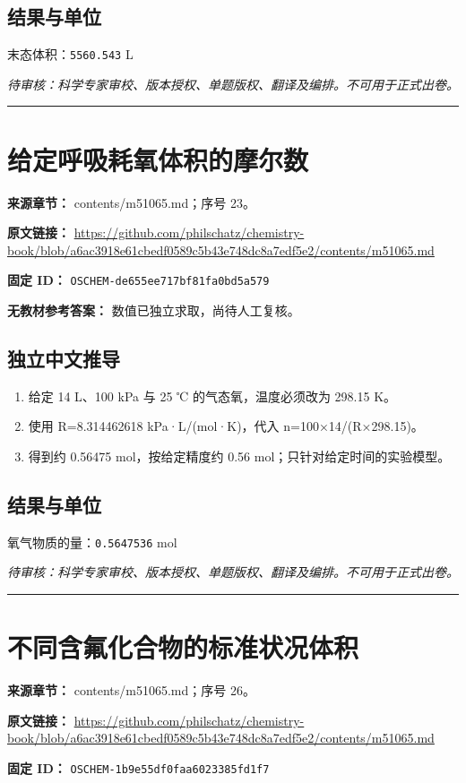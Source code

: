 \documentclass[UTF8,11pt,oneside,openany,fontset=none]{ctexbook}
\begin{document}
\subsection*{结果与单位}
\noindent 末态体积：\texttt{5560.543} L\par
\noindent\textit{待审核：科学专家审校、版本授权、单题版权、翻译及编排。不可用于正式出卷。}
\medskip\hrule\medskip
\section{给定呼吸耗氧体积的摩尔数}
\noindent\textbf{来源章节：} contents/m51065.md；序号 23。\par
\noindent\textbf{原文链接：} \url{https://github.com/philschatz/chemistry-book/blob/a6ac3918e61cbedf0589c5b43e748dc8a7edf5e2/contents/m51065.md}\par
\noindent\textbf{固定 ID：} \texttt{OSCHEM-de655ee717bf81fa0bd5a579}\par
\textbf{无教材参考答案：} 数值已独立求取，尚待人工复核。\par
\subsection*{独立中文推导}
\begin{enumerate}
\item 给定 14 L、100 kPa 与 25 ℃ 的气态氧，温度必须改为 298.15 K。
\item 使用 R=8.314462618 kPa·L/(mol·K)，代入 n=100×14/(R×298.15)。
\item 得到约 0.56475 mol，按给定精度约 0.56 mol；只针对给定时间的实验模型。
\end{enumerate}
\subsection*{结果与单位}
\noindent 氧气物质的量：\texttt{0.5647536} mol\par
\noindent\textit{待审核：科学专家审校、版本授权、单题版权、翻译及编排。不可用于正式出卷。}
\medskip\hrule\medskip
\section{不同含氟化合物的标准状况体积}
\noindent\textbf{来源章节：} contents/m51065.md；序号 26。\par
\noindent\textbf{原文链接：} \url{https://github.com/philschatz/chemistry-book/blob/a6ac3918e61cbedf0589c5b43e748dc8a7edf5e2/contents/m51065.md}\par
\noindent\textbf{固定 ID：} \texttt{OSCHEM-1b9e55df0faa6023385fd1f7}\par
\end{document}
